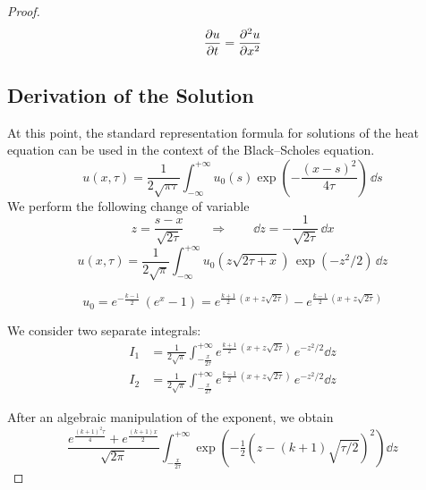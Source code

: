 \begin{proof}
    \begin{equation*}
        \pdv{u}{t} = \pdv[2]{u}{x}
    \end{equation*}


    \subsection{Derivation of the Solution}\label{app:B_solution_Black-Scholes}
    At this point, the standard representation formula for solutions of the heat equation can be used in the context of the Black--Scholes equation.
    \begin{equation*}
        u(x,\tau) = \frac{1}{2\sqrt{\pi \tau}} \int_{-\infty}^{+\infty} u_0(s) \exp\!\left(-\frac{(x - s)^2}{4\tau}\right) \, \dd{s}
    \end{equation*}
    We perform the following change of variable
    \begin{equation*}
        z = \frac{s - x}{\sqrt{2\tau}} \qquad \Longrightarrow \qquad \dd{z} = - \frac{1}{\sqrt{2\tau}}\,\dd{x}
    \end{equation*}
    \begin{equation*}
        u(x,\tau) = \frac{1}{2\sqrt{\pi}} \int_{-\infty}^{+\infty} u_0\left(z\sqrt{2\tau+x}\right)\, \exp({-z^2/2})\,\dd{z}
    \end{equation*}

    \begin{equation*}
        u_0 = e^{-\tfrac{k-1}{2}}\,(e^x - 1) = e^{\tfrac{k+1}{2}\,\left(x + z\sqrt{2\tau}\right)} - e^{\tfrac{k-1}{2}\,\left(x + z\sqrt{2\tau}\right)}
    \end{equation*}
    
    We consider two separate integrals:
    \begin{align*}
        I_1 &= \frac{1}{2\sqrt{\pi}} \int_{-\tfrac{x}{2\tau}}^{+\infty} e^{\tfrac{k+1}{2}\,\left(x + z\sqrt{2\tau}\right)} \, e^{-z^2/2}\dd{z} \\
        I_2 &= \frac{1}{2\sqrt{\pi}} \int_{-\tfrac{x}{2\tau}}^{+\infty} e^{\tfrac{k-1}{2}\,\left(x + z\sqrt{2\tau}\right)} \, e^{-z^2/2}\dd{z}
    \end{align*}
    
    After an algebraic manipulation of the exponent, we obtain
    \begin{equation*}
        \frac{e^{\tfrac{(k+1)^2 \tau}{4}} + e^{\tfrac{(k+1)x}{2}}}{\sqrt{2\pi}} \int_{-\tfrac{x}{2\tau}}^{+\infty} \exp(-\tfrac{1}{2}\left(z - (k+1)\sqrt{\tau / 2}\right)^2) \dd{z}
    \end{equation*}


\end{proof}
